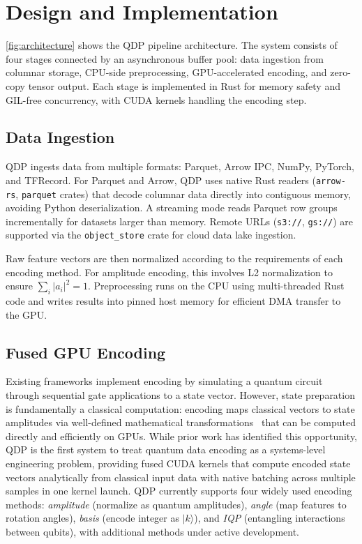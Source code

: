 \documentclass[sigconf, nonacm]{acmart}
\begin{document}
\section{Design and Implementation}

\autoref{fig:architecture} shows the QDP pipeline architecture.
The system consists of four stages connected by an asynchronous buffer pool: data ingestion from columnar storage, CPU-side preprocessing, GPU-accelerated encoding, and zero-copy tensor output.
Each stage is implemented in Rust for memory safety and GIL-free concurrency, with CUDA kernels handling the encoding step.

\subsection{Data Ingestion}

QDP ingests data from multiple formats: Parquet, Arrow IPC, NumPy, PyTorch, and TFRecord.
For Parquet and Arrow, QDP uses native Rust readers (\texttt{arrow-rs}, \texttt{parquet} crates) that decode columnar data directly into contiguous memory, avoiding Python deserialization.
A streaming mode reads Parquet row groups incrementally for datasets larger than memory.
Remote URLs (\texttt{s3://}, \texttt{gs://}) are supported via the \texttt{object\_store} crate for cloud data lake ingestion.

Raw feature vectors are then normalized according to the requirements of each encoding method.
For amplitude encoding, this involves L2 normalization to ensure $\sum_i |a_i|^2 = 1$.
Preprocessing runs on the CPU using multi-threaded Rust code and writes results into pinned host memory for efficient DMA transfer to the GPU.

\subsection{Fused GPU Encoding}

Existing frameworks implement encoding by simulating a quantum circuit through sequential gate applications to a state vector.
However, state preparation is fundamentally a classical computation: encoding maps classical vectors to state amplitudes via well-defined mathematical transformations~\cite{weigold2021, schuld2021} that can be computed directly and efficiently on GPUs.
While prior work has identified this opportunity, QDP is the first system to treat quantum data encoding as a systems-level engineering problem, providing fused CUDA kernels that compute encoded state vectors analytically from classical input data with native batching across multiple samples in one kernel launch.
QDP currently supports four widely used encoding methods: \emph{amplitude} (normalize as quantum amplitudes), \emph{angle} (map features to rotation angles), \emph{basis} (encode integer as $|k\rangle$), and \emph{IQP} (entangling interactions between qubits), with additional methods under active development.
\end{document}
